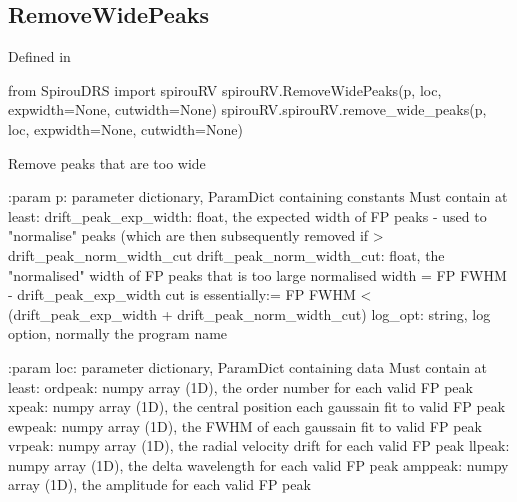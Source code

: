 \begin{minipage}{\textwidth}
\subsection{RemoveWidePeaks}

Defined in \spirouRV{}

\begin{pythonbox}
from SpirouDRS import spirouRV
spirouRV.RemoveWidePeaks(p, loc, expwidth=None, cutwidth=None)
spirouRV.spirouRV.remove_wide_peaks(p, loc, expwidth=None, cutwidth=None)
\end{pythonbox}

\begin{pythondocstring}
Remove peaks that are too wide

:param p: parameter dictionary, ParamDict containing constants
    Must contain at least:
            drift_peak_exp_width: float, the expected width of FP peaks -
                                  used to "normalise" peaks (which are then
                                  subsequently removed if >
                                  drift_peak_norm_width_cut
            drift_peak_norm_width_cut: float, the "normalised" width of
                                       FP peaks that is too large
                                       normalised width = FP FWHM -
                                       drift_peak_exp_width cut is
                                       essentially:=
                                       FP FWHM < (drift_peak_exp_width +
                                       drift_peak_norm_width_cut)
            log_opt: string, log option, normally the program name

:param loc: parameter dictionary, ParamDict containing data
        Must contain at least:
            ordpeak: numpy array (1D), the order number for each valid FP
                     peak
            xpeak: numpy array (1D), the central position each gaussain fit
                   to valid FP peak
            ewpeak: numpy array (1D), the FWHM of each gaussain fit
                    to valid FP peak
            vrpeak: numpy array (1D), the radial velocity drift for each
                    valid FP peak
            llpeak: numpy array (1D), the delta wavelength for each valid
                    FP peak
            amppeak: numpy array (1D), the amplitude for each valid FP peak


\end{pythondocstring}
\end{minipage}
